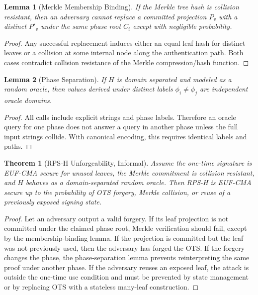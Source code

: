 \documentclass[11pt]{article}
\newtheorem{lemma}{Lemma}
\newtheorem{theorem}{Theorem}
\begin{document}
\begin{lemma}[Merkle Membership Binding]
If the Merkle tree hash is collision resistant, then an adversary cannot replace
a committed projection $P_v$ with a distinct $P'_v$ under the same phase root
$C_i$ except with negligible probability.
\end{lemma}

\begin{proof}
Any successful replacement induces either an equal leaf hash for distinct leaves
or a collision at some internal node along the authentication path. Both cases
contradict collision resistance of the Merkle compression/hash function.
\end{proof}

\begin{lemma}[Phase Separation]
If $H$ is domain separated and modeled as a random oracle, then values derived
under distinct labels $\phi_i\neq\phi_j$ are independent oracle domains.
\end{lemma}

\begin{proof}
All calls include explicit strings and phase labels. Therefore an oracle query
for one phase does not answer a query in another phase unless the full input
strings collide. With canonical encoding, this requires identical labels and
paths.
\end{proof}

\begin{theorem}[RPS-H Unforgeability, Informal]
Assume the one-time signature is EUF-CMA secure for unused leaves, the Merkle
commitment is collision resistant, and $H$ behaves as a domain-separated random
oracle. Then RPS-H is EUF-CMA secure up to the probability of OTS forgery,
Merkle collision, or reuse of a previously exposed signing state.
\end{theorem}

\begin{proof}
Let an adversary output a valid forgery. If its leaf projection is not committed
under the claimed phase root, Merkle verification should fail, except by the
membership-binding lemma. If the projection is committed but the leaf was not
previously used, then the adversary has forged the OTS. If the forgery changes
the phase, the phase-separation lemma prevents reinterpreting the same proof
under another phase. If the adversary reuses an exposed leaf, the attack is
outside the one-time use condition and must be prevented by state management or
by replacing OTS with a stateless many-leaf construction.
\end{proof}
\end{document}
